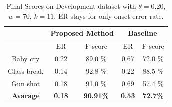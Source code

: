 \documentclass{article}
\begin{document}
\begin{sloppy}

 \begin{table}[t] 
 	\caption{Final Scores on Development dataset with $\theta=0.20$, $w=70$, $k=11$.  ER stays for only-onset error rate.}\label{tbl:finalScore} 
 	\centering 
 	\footnotesize 
 	\begin{tabular} {| c | c | c | c | c |} 
 		\hline 
 		& \multicolumn{2}{c|}{Proposed Method}&\multicolumn{2}{c|}{Baseline}\\ 
 		\hline   
 		& ER    &  F-score  & ER    &  F-score  \\   
 		\hline                                      
 		Baby cry    & 0.22  & 89.0 \%      & 0.67  & 72.0 \%\\ 
 		\hline                                      
 		Glass break & 0.14  & 92.8 \%        & 0.22  & 88.5 \%\\ 
 		\hline 
 		Gun shot    & 0.18  & 91.0 \%        & 0.69  & 57.4 \%\\ 
 		\hline 
 		\textbf{Avarage} & \textbf{0.18} & \textbf{90.91\%}& \textbf{0.53} & \textbf{72.7\%}\\ 
 		\hline 
 		
 	\end{tabular} 
 	
 \end{table} 



\end{sloppy}
\end{document}
